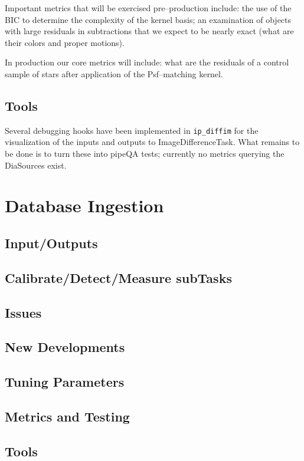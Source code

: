 \documentclass[12pt]{article}
\begin{document}
Important metrics that will be exercised pre--production include: the
use of the BIC to determine the complexity of the kernel basis; an
examination of objects with large residuals in subtractions that we
expect to be nearly exact (what are their colors and proper motions).

In production our core metrics will include: what are the residuals of
a control sample of stars after application of the Psf--matching
kernel.

\subsection{Tools}
Several debugging hooks have been implemented in {\tt ip\_diffim} for
the visualization of the inputs and outputs to ImageDifferenceTask.
What remains to be done is to turn these into pipeQA tests; currently
no metrics querying the DiaSources exist.


\clearpage 
\section{Database Ingestion} 

\subsection{Input/Outputs}
\subsection{Calibrate/Detect/Measure subTasks}
\subsection{Issues}
\subsection{New Developments}
\subsection{Tuning Parameters}
\subsection{Metrics and Testing}
\subsection{Tools}
\end{document}
